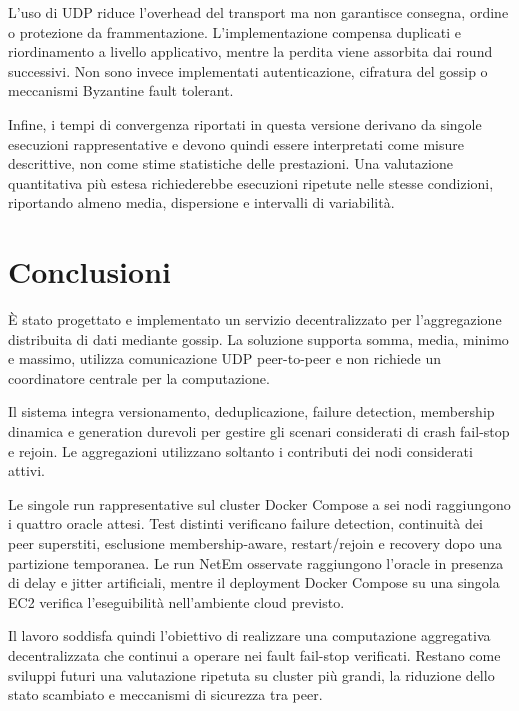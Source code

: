 \documentclass[conference]{IEEEtran}
\begin{document}
L'uso di UDP riduce l'overhead del transport ma non garantisce consegna, ordine o protezione da frammentazione. L'implementazione compensa duplicati e riordinamento a livello applicativo, mentre la perdita viene assorbita dai round successivi. Non sono invece implementati autenticazione, cifratura del gossip o meccanismi Byzantine fault tolerant.

Infine, i tempi di convergenza riportati in questa versione derivano da singole esecuzioni rappresentative e devono quindi essere interpretati come misure descrittive, non come stime statistiche delle prestazioni. Una valutazione quantitativa più estesa richiederebbe esecuzioni ripetute nelle stesse condizioni, riportando almeno media, dispersione e intervalli di variabilità.

\section{Conclusioni}

È stato progettato e implementato un servizio decentralizzato per l'aggregazione distribuita di dati mediante gossip. La soluzione supporta somma, media, minimo e massimo, utilizza comunicazione UDP peer-to-peer e non richiede un coordinatore centrale per la computazione.

Il sistema integra versionamento, deduplicazione, failure detection, membership dinamica e generation durevoli per gestire gli scenari considerati di crash fail-stop e rejoin. Le aggregazioni utilizzano soltanto i contributi dei nodi considerati attivi.

Le singole run rappresentative sul cluster Docker Compose a sei nodi raggiungono i quattro oracle attesi. Test distinti verificano failure detection, continuità dei peer superstiti, esclusione membership-aware, restart/rejoin e recovery dopo una partizione temporanea. Le run NetEm osservate raggiungono l'oracle in presenza di delay e jitter artificiali, mentre il deployment Docker Compose su una singola EC2 verifica l'eseguibilità nell'ambiente cloud previsto.

Il lavoro soddisfa quindi l'obiettivo di realizzare una computazione aggregativa decentralizzata che continui a operare nei fault fail-stop verificati. Restano come sviluppi futuri una valutazione ripetuta su cluster più grandi, la riduzione dello stato scambiato e meccanismi di sicurezza tra peer.
\end{document}
